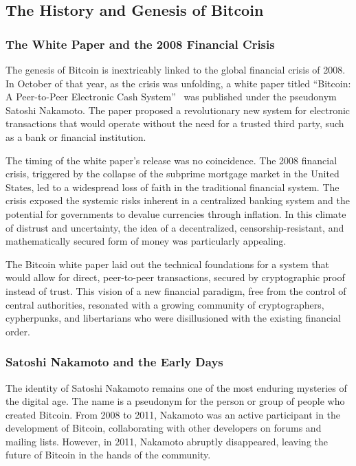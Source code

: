 \subsection{The History and Genesis of
	Bitcoin}\label{section-1-the-history-and-genesis-of-bitcoin}

\subsubsection{The White Paper and the 2008 Financial
	Crisis}\label{the-white-paper-and-the-2008-financial-crisis}

The genesis of Bitcoin is inextricably linked to the global financial
crisis of 2008. In October of that year, as the crisis was unfolding, a
white paper titled ``Bitcoin: A Peer-to-Peer Electronic Cash System''~\cite{nakamoto2008bitcoin}
was published under the pseudonym Satoshi Nakamoto. The paper proposed a
revolutionary new system for electronic transactions that would operate
without the need for a trusted third party, such as a bank or financial
institution.

The timing of the white paper's release was no coincidence. The 2008
financial crisis, triggered by the collapse of the subprime mortgage
market in the United States, led to a widespread loss of faith in the
traditional financial system. The crisis exposed the systemic risks
inherent in a centralized banking system and the potential for
governments to devalue currencies through inflation. In this climate of
distrust and uncertainty, the idea of a decentralized,
censorship-resistant, and mathematically secured form of money was
particularly appealing.

The Bitcoin white paper laid out the technical foundations for a system
that would allow for direct, peer-to-peer transactions, secured by
cryptographic proof instead of trust. This vision of a new financial
paradigm, free from the control of central authorities, resonated with a
growing community of cryptographers, cypherpunks, and libertarians who
were disillusioned with the existing financial order.

\subsubsection{Satoshi Nakamoto and the Early
	Days}\label{satoshi-nakamoto-and-the-early-days}

The identity of Satoshi Nakamoto remains one of the most enduring
mysteries of the digital age. The name is a pseudonym for the person or
group of people who created Bitcoin. From 2008 to 2011, Nakamoto was an
active participant in the development of Bitcoin, collaborating with
other developers on forums and mailing lists. However, in 2011, Nakamoto
abruptly disappeared, leaving the future of Bitcoin in the hands of the
community.


